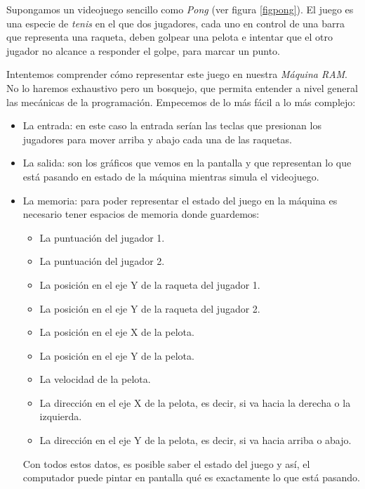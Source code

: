 Supongamos un videojuego sencillo como \emph{Pong} (ver figura \ref{figpong}). El juego es una especie de \emph{tenis} en el que dos jugadores, cada uno en control de una barra que representa una raqueta, deben golpear una pelota e intentar que el otro jugador no alcance a responder el golpe, para marcar un punto. 

Intentemos comprender cómo representar este juego en nuestra \emph{Máquina RAM}. No lo haremos exhaustivo pero un bosquejo, que permita entender a nivel general las mecánicas de la programación. Empecemos de lo más fácil a lo más complejo:

\begin{itemize}

	
	\item La entrada: en este caso la entrada serían las teclas que presionan los jugadores para mover arriba y abajo cada una de las raquetas.
	
	\item La salida: son los gráficos que vemos en la pantalla y que representan lo que está pasando en estado de la máquina mientras simula el videojuego.
	
	\item La memoria: para poder representar el estado del juego en la máquina es necesario tener espacios de memoria donde guardemos:
	
	\begin{itemize}
		\item La puntuación del jugador 1.
		\item La puntuación del jugador 2.
		\item La posición en el eje Y de la raqueta del jugador 1.
		\item La posición en el eje Y de la raqueta del jugador 2.
		\item La posición en el eje X de la pelota.
		\item La posición en el eje Y de la pelota.
		\item La velocidad de la pelota.
		\item La dirección en el eje X de la pelota, es decir, si va hacia la derecha o la izquierda.
		\item La dirección en el eje Y de la pelota, es decir, si va hacia arriba o abajo.
	\end{itemize}

	Con todos estos datos, es posible saber el estado del juego y así, el computador puede pintar en pantalla qué es exactamente lo que está pasando.
	

\end{itemize}
